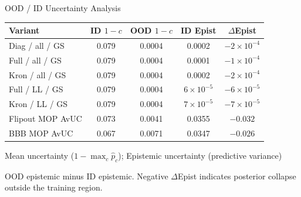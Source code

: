 \documentclass{beamer}
\begin{document}
\begin{frame}{OOD / ID Uncertainty Analysis}
\begin{threeparttable}
\centering
\small
\begin{tabular}{lcccc}
\toprule
\textbf{Variant} & \textbf{ID $1{-}c$} & \textbf{OOD $1{-}c$} & \textbf{ID Epist} & \textbf{$\Delta$Epist} \\
\midrule
Diag / all / GS & 0.079 & 0.0004 & 0.0002 & $-2\!\times\!10^{-4}$ \\
Full / all / GS & 0.079 & 0.0004 & 0.0001 & $-1\!\times\!10^{-4}$ \\
Kron / all / GS & 0.079 & 0.0004 & 0.0002 & $-2\!\times\!10^{-4}$ \\
Full / LL / GS & 0.079 & 0.0004 & $6\!\times\!10^{-5}$ & $-6\!\times\!10^{-5}$ \\
Kron / LL / GS & 0.079 & 0.0004 & $7\!\times\!10^{-5}$ & $-7\!\times\!10^{-5}$ \\
Flipout MOP AvUC & 0.073 & 0.0041 & 0.0355 & $-0.032$ \\
BBB MOP AvUC & 0.067 & 0.0071 & 0.0347 & $-0.026$ \\
\bottomrule
\end{tabular}
{\small
\begin{tablenotes}
\item[$1{-}c$] Mean uncertainty ($1 - \max_c \hat{p}_c$); \;[Epist] Epistemic uncertainty (predictive variance)
\item[$\Delta$Epist] OOD epistemic minus ID epistemic. Negative $\Delta$Epist indicates posterior collapse outside the training region.
\end{tablenotes}}
\end{threeparttable}
\end{frame}
\end{document}

